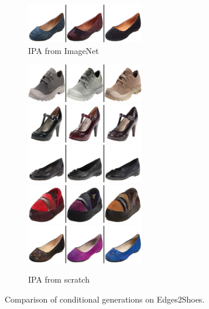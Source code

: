 \begin{figure}[t]
\begin{subfigure}[t]{0.25\textwidth}
      \includegraphics[height=\edgesstuffimgheight]{figs/cigcvae/image-samples/shoes/image_aipo_4_imagenet_samples.png}
      \caption{IPA from ImageNet}
    \end{subfigure}
    \begin{subfigure}[t]{0.25\textwidth}
      \centering
      \includegraphics[height=\edgesstuffimgheight]{figs/cigcvae/image-samples/shoes/image_aipo_0_scratch_samples.png}
      \includegraphics[height=\edgesstuffimgheight]{figs/cigcvae/image-samples/shoes/image_aipo_1_scratch_samples.png}
      \includegraphics[height=\edgesstuffimgheight]{figs/cigcvae/image-samples/shoes/image_aipo_2_scratch_samples.png}
      \includegraphics[height=\edgesstuffimgheight]{figs/cigcvae/image-samples/shoes/image_aipo_3_scratch_samples.png}
      \includegraphics[height=\edgesstuffimgheight]{figs/cigcvae/image-samples/shoes/image_aipo_4_scratch_samples.png}
      \caption{IPA from scratch}
    \end{subfigure}
    \caption{Comparison of conditional generations on Edges2Shoes.}
    \vspace{-.5cm}
    \label{fig:cigcvae-shoes-samples}
  \end{figure}



